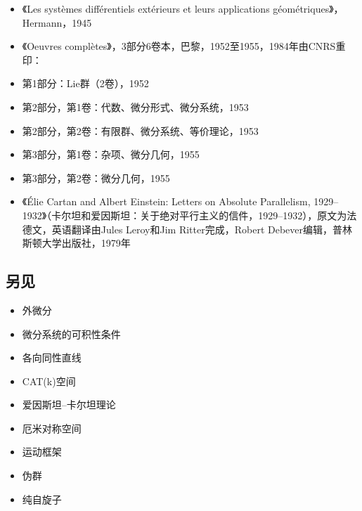 \begin{itemize}
\item 《Les systèmes différentiels extérieurs et leurs applications géométriques》，Hermann，1945  
\item 《Oeuvres complètes》，3部分6卷本，巴黎，1952至1955，1984年由CNRS重印：  
\item 第1部分：Lie群（2卷），1952  
\item 第2部分，第1卷：代数、微分形式、微分系统，1953  
\item 第2部分，第2卷：有限群、微分系统、等价理论，1953  
\item 第3部分，第1卷：杂项、微分几何，1955  
\item 第3部分，第2卷：微分几何，1955  
\item 《Élie Cartan and Albert Einstein: Letters on Absolute Parallelism, 1929–1932》（卡尔坦和爱因斯坦：关于绝对平行主义的信件，1929–1932），原文为法德文，英语翻译由Jules Leroy和Jim Ritter完成，Robert Debever编辑，普林斯顿大学出版社，1979年
\end{itemize}
\subsection{另见}
\begin{itemize}
\item 外微分  
\item 微分系统的可积性条件  
\item 各向同性直线  
\item CAT(k)空间  
\item 爱因斯坦–卡尔坦理论  
\item 厄米对称空间  
\item 运动框架  
\item 伪群  
\item 纯自旋子
\end{itemize}